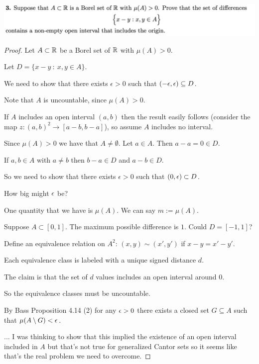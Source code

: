 \newpage
\begin{mdframed}
\includegraphics[width=400pt]{img/analysis--berkeley-202a-hw05-ad8b.png}
\end{mdframed}

\begin{proof}
  Let $A \subset \mathbb{R}$ be a Borel set of $\mathbb{R}$ with $\mu(A) > 0$.

  Let $D = \big\{ x - y ~:~ x, y \in A\big\}$.

  We need to show that there exists $\epsilon > 0$ such that $(-\epsilon, \epsilon) \subseteq D$.

  Note that $A$ is uncountable, since $\mu(A) > 0$.

  If $A$ includes an open interval $(a, b)$ then the result easily follows (consider the
  map $z:(a, b)^2\to [a-b, b-a]$), so assume $A$ includes no interval.

  Since $\mu(A) > 0$ we have that $A \neq \emptyset$. Let $a \in A$. Then $a - a = 0 \in D$.

  If $a, b \in A$ with $a \neq b$ then $b - a \in D$ and $a - b \in D$.

  So we need to show that there exists $\epsilon > 0$ such that $(0, \epsilon) \subset D$.

  How big might $\epsilon$ be?

  One quantity that we have is $\mu(A)$. We can say $m := \mu(A)$.

  Suppose $A \subset [0, 1]$. The maximum possible difference is $1$. Could $D = [-1, 1]$?

  Define an equivalence relation on $A^2$: $(x, y) \sim (x', y')$ if $x - y = x' - y'$.

  Each equivalence class is labeled with a unique signed distance $d$.

  The claim is that the set of $d$ values includes an open interval around $0$.

  So the equivalence classes must be uncountable.

  By Bass Proposition 4.14 (2) for any $\epsilon > 0$ there exists a closed set $G \subseteq A$ such that $\mu(A \setminus G) < \epsilon$.

  ... I was thinking to show that this implied the existence of an open interval included in $A$ but that's not
  true for generalized Cantor sets so it seems like that's the real problem we need to overcome.
\end{proof}




























